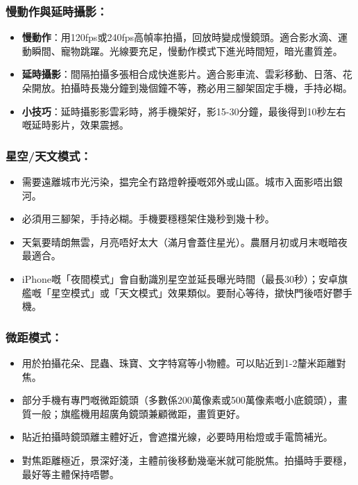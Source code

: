\subsubsection*{慢動作與延時攝影：}

\begin{itemize}
  \item \textbf{慢動作}：用120fps或240fps高幀率拍攝，回放時變成慢鏡頭。適合影水滴、運動瞬間、寵物跳躍。光線要充足，慢動作模式下進光時間短，暗光畫質差。
  \item \textbf{延時攝影}：間隔拍攝多張相合成快進影片。適合影車流、雲彩移動、日落、花朵開放。拍攝時長幾分鐘到幾個鐘不等，務必用三腳架固定手機，手持必糊。
  \item \textbf{小技巧}：延時攝影影雲彩時，將手機架好，影15-30分鐘，最後得到10秒左右嘅延時影片，效果震撼。
\end{itemize}

\subsubsection*{星空/天文模式：}

\begin{itemize}
  \item 需要遠離城市光污染，揾完全冇路燈幹擾嘅郊外或山區。城市入面影唔出銀河。
  \item 必須用三腳架，手持必糊。手機要穩穩架住幾秒到幾十秒。
  \item 天氣要晴朗無雲，月亮唔好太大（滿月會蓋住星光）。農曆月初或月末嘅暗夜最適合。
  \item iPhone嘅「夜間模式」會自動識別星空並延長曝光時間（最長30秒）；安卓旗艦嘅「星空模式」或「天文模式」效果類似。要耐心等待，撳快門後唔好鬱手機。
\end{itemize}

\subsubsection*{微距模式：}

\begin{itemize}
  \item 用於拍攝花朵、昆蟲、珠寶、文字特寫等小物體。可以貼近到1-2釐米距離對焦。
  \item 部分手機有專門嘅微距鏡頭（多數係200萬像素或500萬像素嘅小底鏡頭），畫質一般；旗艦機用超廣角鏡頭兼顧微距，畫質更好。
  \item 貼近拍攝時鏡頭離主體好近，會遮擋光線，必要時用枱燈或手電筒補光。
  \item 對焦距離極近，景深好淺，主體前後移動幾毫米就可能脱焦。拍攝時手要穩，最好等主體保持唔鬱。
\end{itemize}

